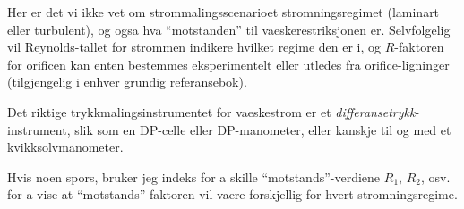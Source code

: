 Her er det vi ikke vet om strommalingsscenarioet stromningsregimet (laminart eller turbulent), og ogsa hva ``motstanden'' til vaeskerestriksjonen er.  Selvfolgelig vil Reynolds-tallet for strommen indikere hvilket regime den er i, og $R$-faktoren for orificen kan enten bestemmes eksperimentelt eller utledes fra orifice-ligninger (tilgjengelig i enhver grundig referansebok).

\vskip 10pt

Det riktige trykkmalingsinstrumentet for vaeskestrom er et {\it differansetrykk}-instrument, slik som en DP-celle eller DP-manometer, eller kanskje til og med et kvikksolvmanometer.








Hvis noen spors, bruker jeg indeks for a skille ``motstands''-verdiene $R_1$, $R_2$, osv. for a vise at ``motstands''-faktoren vil vaere forskjellig for hvert stromningsregime.




